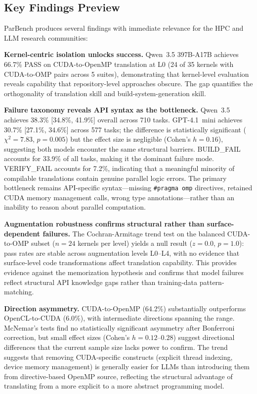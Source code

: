 \documentclass[conference]{IEEEtran}
\begin{document}
\subsection{Key Findings Preview}
\label{sec:findings-preview}

ParBench produces several findings with immediate relevance for the HPC and LLM research communities:

\textbf{Kernel-centric isolation unlocks success.} Qwen~3.5 397B-A17B achieves 66.7\% PASS on CUDA-to-OpenMP translation at L0 (24 of 35 kernels with CUDA-to-OMP pairs across 5 suites), demonstrating that kernel-level evaluation reveals capability that repository-level approaches obscure. The gap quantifies the orthogonality of translation skill and build-system-generation skill.

\textbf{Failure taxonomy reveals API syntax as the bottleneck.} Qwen~3.5 achieves 38.3\% [34.8\%, 41.9\%] overall across 710 tasks. GPT-4.1~mini achieves 30.7\% [27.1\%, 34.6\%] across 577 tasks; the difference is statistically significant ($\chi^2 = 7.83$, $p = 0.005$) but the effect size is negligible (Cohen's $h = 0.16$), suggesting both models encounter the same structural barriers. %
BUILD\_FAIL accounts for 33.9\% of all tasks, making it the dominant failure mode. VERIFY\_FAIL accounts for 7.2\%, indicating that a meaningful minority of compilable translations contain genuine parallel logic errors. The primary bottleneck remains API-specific syntax---missing \texttt{\#pragma omp} directives, retained CUDA memory management calls, wrong type annotations---rather than an inability to reason about parallel computation.

\textbf{Augmentation robustness confirms structural rather than surface-dependent failures.} The Cochran-Armitage trend test on the balanced CUDA-to-OMP subset ($n{=}24$ kernels per level) yields a null result ($z = 0.0$, $p = 1.0$): pass rates are stable across augmentation levels L0--L4, with no evidence that surface-level code transformations affect translation capability. This provides evidence against the memorization hypothesis and confirms that model failures reflect structural API knowledge gaps rather than training-data pattern-matching.

\textbf{Direction asymmetry.} CUDA-to-OpenMP (64.2\%) substantially outperforms OpenCL-to-CUDA (6.0\%), with intermediate directions spanning the range. McNemar's tests find no statistically significant asymmetry after Bonferroni correction, but small effect sizes (Cohen's $h = 0.12$--$0.28$) suggest directional differences that the current sample size lacks power to confirm. The trend suggests that removing CUDA-specific constructs (explicit thread indexing, device memory management) is generally easier for LLMs than introducing them from directive-based OpenMP source, reflecting the structural advantage of translating from a more explicit to a more abstract programming model.
\end{document}
